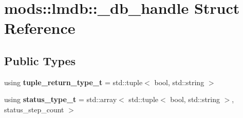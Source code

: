 \hypertarget{structmods_1_1lmdb_1_1__db__handle}{}\section{mods\+:\+:lmdb\+:\+:\+\_\+db\+\_\+handle Struct Reference}
\label{structmods_1_1lmdb_1_1__db__handle}
\subsection*{Public Types}
\begin{DoxyCompactItemize}
\item 
\mbox{\label{structmods_1_1lmdb_1_1__db__handle_a66496077f5c3b1812e50cf1ce2364bb7}} 
using {\bfseries tuple\+\_\+return\+\_\+type\+\_\+t} = std\+::tuple$<$ bool, std\+::string $>$
\item 
\mbox{\label{structmods_1_1lmdb_1_1__db__handle_a2d8b717ebaa92132ce34d15ff85579c2}} 
using {\bfseries status\+\_\+type\+\_\+t} = std\+::array$<$ std\+::tuple$<$ bool, std\+::string $>$, status\+\_\+step\+\_\+count $>$
\end{DoxyCompactItemize}

